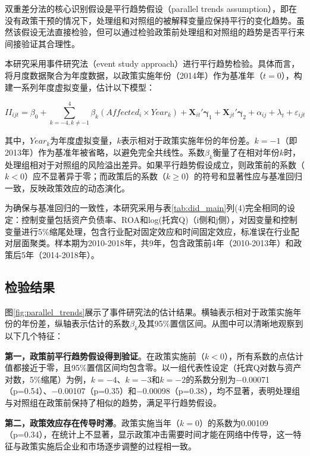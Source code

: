 双重差分法的核心识别假设是平行趋势假设（parallel trends assumption），即在没有政策干预的情况下，处理组和对照组的被解释变量应保持平行的变化趋势\citep{angrist2009mostly}。虽然该假设无法直接检验，但可以通过检验政策前处理组和对照组的趋势是否平行来间接验证其合理性。

本研究采用事件研究法（event study approach）进行平行趋势检验。具体而言，将月度数据聚合为年度数据，以政策实施年份（2014年）作为基准年（$t=0$），构建一系列年度虚拟变量，估计以下模型：

\begin{equation}
\label{eq:event_study}
II_{ijt} = \beta_0 + \sum_{k=-4, k \neq -1}^{4} \beta_k (Affected_i \times Year_k) + \bm{X}_{it}'\bm{\gamma}_1 + \bm{X}_{jt}'\bm{\gamma}_2 + \alpha_{ij} + \lambda_t + \varepsilon_{ijt}
\end{equation}

其中，$Year_k$为年度虚拟变量，$k$表示相对于政策实施年份的年份差。$k=-1$（即2013年）作为基准年被省略，以避免完全共线性。系数$\beta_k$衡量了在相对年份$k$时，处理组相对于对照组的风险溢出差异。如果平行趋势假设成立，则政策前的系数（$k<0$）应不显著异于零；而政策后的系数（$k \geq 0$）的符号和显著性应与基准回归一致，反映政策效应的动态演化。

为确保与基准回归的一致性，本研究采用与表\ref{tab:did_main}列(4)完全相同的设定：控制变量包括资产负债率、ROA和log(托宾Q)（i侧和j侧），对因变量和控制变量进行5\%缩尾处理，包含行业配对固定效应和时间固定效应，标准误在行业配对层面聚类。样本期为2010-2018年，共9年，包含政策前4年（2010-2013年）和政策后5年（2014-2018年）。

\subsection{检验结果}

图\ref{fig:parallel_trends}展示了事件研究法的估计结果。横轴表示相对于政策实施年份的年份差，纵轴表示估计的系数$\beta_k$及其95\%置信区间。从图中可以清晰地观察到以下几个特征：

\textbf{第一，政策前平行趋势假设得到验证}。在政策实施前（$k<0$），所有系数的点估计值都接近于零，且95\%置信区间均包含零。以一组代表性设定（托宾Q对数与资产对数，5\%缩尾）为例，$k=-4$、$k=-3$和$k=-2$的系数分别为$-$0.00071（p=0.54）、$-$0.00107（p=0.35）和$-$0.00098（p=0.38），均不显著，表明处理组与对照组在政策前保持了相似的趋势，满足平行趋势假设。

\textbf{第二，政策效应存在传导时滞}。政策实施当年（$k=0$）的系数为0.00109（p=0.34），在统计上不显著，显示政策冲击需要时间才能在网络中传导，这一特征与政策实施后企业和市场逐步调整的过程相一致。

